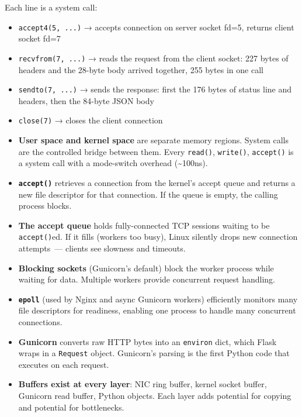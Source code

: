 \noindent{}Each line is a system call:

\begin{itemize}
\tightlist
\item
  \texttt{accept4(5,\ ...)} → accepts connection on server socket fd=5, returns client socket fd=7
\item
  \texttt{recvfrom(7,\ ...)} → reads the request from the client socket: 227 bytes of headers and the 28-byte body arrived together, 255 bytes in one call
\item
  \texttt{sendto(7,\ ...)} → sends the response: first the 176 bytes of status line and headers, then the 84-byte JSON body
\item
  \texttt{close(7)} → closes the client connection
\end{itemize}

\label{30-kernel-application-handoff:key-takeaways}
\begin{takeaways}

\begin{itemize}
\tightlist
\item
  \textbf{User space and kernel space} are separate memory regions. System calls are the controlled bridge between them. Every \texttt{read()}, \texttt{write()}, \texttt{accept()} is a system call with a mode-switch overhead (\textasciitilde100ns).
\item
  \textbf{\texttt{accept()}} retrieves a connection from the kernel's accept queue and returns a new file descriptor for that connection. If the queue is empty, the calling process blocks.
\item
  \textbf{The accept queue} holds fully-connected TCP sessions waiting to be \texttt{accept()}ed. If it fills (workers too busy), Linux silently drops new connection attempts~--- clients see slowness and timeouts.
\item
  \textbf{Blocking sockets} (Gunicorn's default) block the worker process while waiting for data. Multiple workers provide concurrent request handling.
\item
  \textbf{\texttt{epoll}} (used by Nginx and async Gunicorn workers) efficiently monitors many file descriptors for readiness, enabling one process to handle many concurrent connections.
\item
  \textbf{Gunicorn} converts raw HTTP bytes into an \texttt{environ} dict, which Flask wraps in a \texttt{Request} object. Gunicorn's parsing is the first Python code that executes on each request.
\item
  \textbf{Buffers exist at every layer}: NIC ring buffer, kernel socket buffer, Gunicorn read buffer, Python objects. Each layer adds potential for copying and potential for bottlenecks.
\end{itemize}

\end{takeaways}

